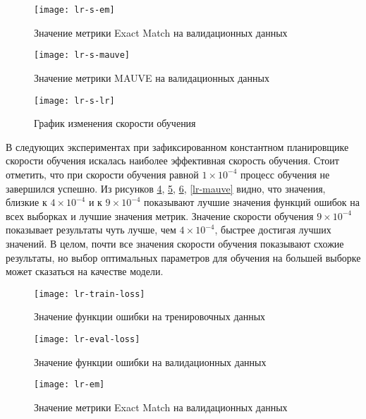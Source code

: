 \begin{figure}[H]
  \centering
  \texttt{[image: lr-s-em]}
  \caption{Значение метрики Exact Match на валидационных данных}
  \label{lr-s-em}
\end{figure}

\begin{figure}[H]
  \centering
  \texttt{[image: lr-s-mauve]}
  \caption{Значение метрики MAUVE на валидационных данных}
  \label{lr-s-mauve}
\end{figure}

\begin{figure}[H]
  \centering
  \texttt{[image: lr-s-lr]}
  \caption{График изменения скорости обучения}
  \label{lr-s-lr}
\end{figure}

В следующих экспериментах при зафиксированном константном планировщике скорости обучения искалась наиболее эффективная скорость обучения. Стоит отметить, что при скорости обучения равной $1 \times 10^{-4}$ процесс обучения не завершился успешно. Из рисунков \ref{lr-train-loss}, \ref{lr-eval-loss}, \ref{lr-em}, \ref{lr-mauve} видно, что значения, близкие к $4 \times 10^{-4}$ и к $9 \times 10^{-4}$ показывают лучшие значения функций ошибок на всех выборках и лучшие значения метрик. Значение скорости обучения $9 \times 10^{-4}$ показывает результаты чуть лучше, чем $4 \times 10^{-4}$, быстрее достигая лучших значений. В целом, почти все значения скорости обучения показывают схожие результаты, но выбор оптимальных параметров для обучения на большей выборке может сказаться на качестве модели.

\begin{figure}[H]
  \centering
  \texttt{[image: lr-train-loss]}
  \caption{Значение функции ошибки на тренировочных данных}
  \label{lr-train-loss}
\end{figure}

\begin{figure}[H]
  \centering
  \texttt{[image: lr-eval-loss]}
  \caption{Значение функции ошибки на валидационных данных}
  \label{lr-eval-loss}
\end{figure}

\begin{figure}[H]
  \centering
  \texttt{[image: lr-em]}
  \caption{Значение метрики Exact Match на валидационных данных}
  \label{lr-em}
\end{figure}

